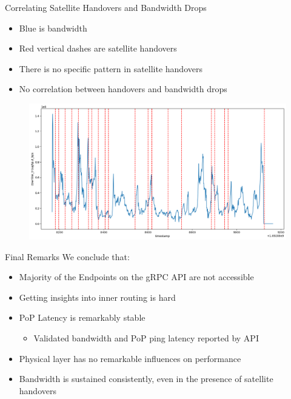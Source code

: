 \documentclass[NET,english,beameralt]{tumbeamer}
\begin{document}
\begin{frame}[fragile]{Correlating Satellite Handovers and Bandwidth Drops}
    \begin{itemize}
        \item Blue is bandwidth
        \item Red vertical dashes are satellite handovers
        \item There is no specific pattern in satellite handovers
        \item No correlation between handovers and bandwidth drops
    \end{itemize}
    \begin{figure}
        \includegraphics[width=0.8\columnwidth]{pics/correlation_handovers_bw.png}
    \end{figure}
\end{frame}

\begin{frame}[fragile]{Final Remarks}
    We conclude that:
    \begin{itemize}
        \item Majority of the Endpoints on the gRPC API are not accessible
        \item Getting insights into inner routing is hard
        \item PoP Latency is remarkably stable
        \begin{itemize}
            \item Validated bandwidth and PoP ping latency reported by API
        \end{itemize}   
        \item Physical layer has no remarkable influences on performance
        \item Bandwidth is sustained consistently, even in the presence of satellite handovers
    \end{itemize}
\end{frame}
\end{document}
